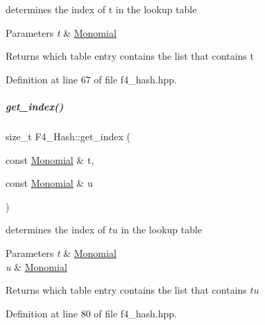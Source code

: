 determines the index of {\ttfamily t} in the lookup table 


\begin{DoxyParams}{Parameters}
{\em t} & {\ttfamily \hyperlink{group__polygroup_class_monomial}{Monomial}} \\
\hline
\end{DoxyParams}
\begin{DoxyReturn}{Returns}
which table entry contains the list that contains {\ttfamily t} 
\end{DoxyReturn}


Definition at line 67 of file f4\+\_\+hash.\+hpp.

\mbox{\label{group___g_b_computation_a12cff698cefa0375ab76ee6c36a0ce6c}} 
\subparagraph{\texorpdfstring{get\+\_\+index()}{get\_index()}\hspace{0.1cm}{\footnotesize\ttfamily [2/2]}}
{\footnotesize\ttfamily size\+\_\+t F4\+\_\+\+Hash\+::get\+\_\+index (\begin{DoxyParamCaption}\item[{const \hyperlink{group__polygroup_class_monomial}{Monomial} \&}]{t,  }\item[{const \hyperlink{group__polygroup_class_monomial}{Monomial} \&}]{u }\end{DoxyParamCaption})\hspace{0.3cm}{\ttfamily [inline]}}



determines the index of $tu$ in the lookup table 


\begin{DoxyParams}{Parameters}
{\em t} & {\ttfamily \hyperlink{group__polygroup_class_monomial}{Monomial}} \\
\hline
{\em u} & {\ttfamily \hyperlink{group__polygroup_class_monomial}{Monomial}} \\
\hline
\end{DoxyParams}
\begin{DoxyReturn}{Returns}
which table entry contains the list that contains $tu$ 
\end{DoxyReturn}


Definition at line 80 of file f4\+\_\+hash.\+hpp.

